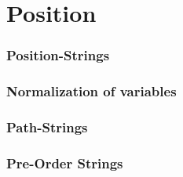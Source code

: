 
\section{Position}

\begin{frame}
	\frametitle{Position-Strings}
	
\end{frame}

\begin{frame}
	\frametitle{Normalization of variables}
	
\end{frame}

\begin{frame}
	\frametitle{Path-Strings}
	
\end{frame}

\begin{frame}
	\frametitle{Pre-Order Strings}
	
\end{frame}

